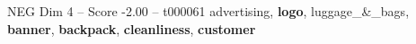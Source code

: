 \begin{textsample}{NEG Dim 4 – Score -2.00 – t000061}  \label{ex:f4_neg_013}
advertising, \textbf{logo}, luggage\_\&\_bags, \textbf{banner}, \textbf{backpack}, \textbf{cleanliness}, \textbf{customer}

\end{textsample}

